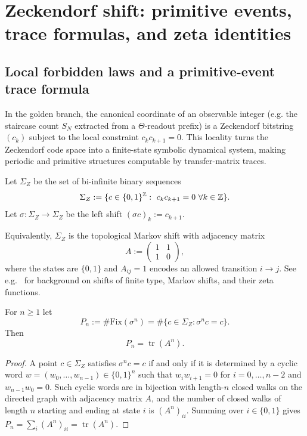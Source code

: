 \section{Zeckendorf shift: primitive events, trace formulas, and zeta identities}
\label{sec:zeckendorf_shift}

\subsection{Local forbidden laws and a primitive-event trace formula}
\label{subsec:zeckendorf_primitive_trace}
In the golden branch, the canonical coordinate of an observable integer (e.g. the staircase count $S_N$ extracted from a $\Theta$-readout prefix) is a Zeckendorf bitstring $(c_k)$ subject to the local constraint $c_k c_{k+1}=0$. This locality turns the Zeckendorf code space into a finite-state symbolic dynamical system, making periodic and primitive structures computable by transfer-matrix traces.

\begin{definition}
Let $\Sigma_Z$ be the set of bi-infinite binary sequences
$$
\Sigma_Z:=\{c\in\{0,1\}^{\ZZ}:\ c_k c_{k+1}=0\ \forall k\in\ZZ\}.
$$
Let $\sigma:\Sigma_Z\to\Sigma_Z$ be the left shift $(\sigma c)_k:=c_{k+1}$.
\end{definition}

Equivalently, $\Sigma_Z$ is the topological Markov shift with adjacency matrix
$$
A:=\begin{pmatrix}1&1\\ 1&0\end{pmatrix},
$$
where the states are $\{0,1\}$ and $A_{ij}=1$ encodes an allowed transition $i\to j$.
See e.g.~\cite{LindMarcus1995} for background on shifts of finite type, Markov shifts, and their zeta functions.

\begin{proposition}
\label{prop:zeckendorf_trace}
For $n\ge 1$ let
$$
P_n:=\#\mathrm{Fix}(\sigma^n)=\#\{c\in\Sigma_Z:\sigma^n c=c\}.
$$
Then
$$
P_n=\operatorname{tr}(A^n).
$$
\end{proposition}

\begin{proof}
A point $c\in\Sigma_Z$ satisfies $\sigma^n c=c$ if and only if it is determined by a cyclic word $w=(w_0,\dots,w_{n-1})\in\{0,1\}^n$ such that $w_i w_{i+1}=0$ for $i=0,\dots,n-2$ and $w_{n-1}w_0=0$. Such cyclic words are in bijection with length-$n$ closed walks on the directed graph with adjacency matrix $A$, and the number of closed walks of length $n$ starting and ending at state $i$ is $(A^n)_{ii}$. Summing over $i\in\{0,1\}$ gives $P_n=\sum_i (A^n)_{ii}=\operatorname{tr}(A^n)$.
\end{proof}

